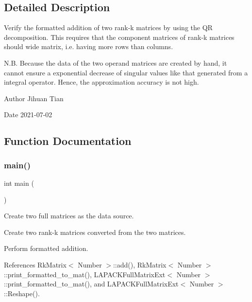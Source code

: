 \subsection{Detailed Description}
Verify the formatted addition of two rank-\/k matrices by using the QR decomposition. This requires that the component matrices of rank-\/k matrices should wide matrix, i.\+e. having more rows than columns. 

N.\+B. Because the data of the two operand matrices are created by hand, it cannot ensure a exponential decrease of singular values like that generated from a integral operator. Hence, the approximation accuracy is not high.

\begin{DoxyAuthor}{Author}
Jihuan Tian 
\end{DoxyAuthor}
\begin{DoxyDate}{Date}
2021-\/07-\/02 
\end{DoxyDate}


\subsection{Function Documentation}
\mbox{\label{rkmatrix-add-formatted-using-qr_8cc_ae66f6b31b5ad750f1fe042a706a4e3d4}} 
\subsubsection{\texorpdfstring{main()}{main()}}
{\footnotesize\ttfamily int main (\begin{DoxyParamCaption}{ }\end{DoxyParamCaption})}

Create two full matrices as the data source.

Create two rank-\/k matrices converted from the two matrices.

Perform formatted addition.

References Rk\+Matrix$<$ Number $>$\+::add(), Rk\+Matrix$<$ Number $>$\+::print\+\_\+formatted\+\_\+to\+\_\+mat(), L\+A\+P\+A\+C\+K\+Full\+Matrix\+Ext$<$ Number $>$\+::print\+\_\+formatted\+\_\+to\+\_\+mat(), and L\+A\+P\+A\+C\+K\+Full\+Matrix\+Ext$<$ Number $>$\+::\+Reshape().


